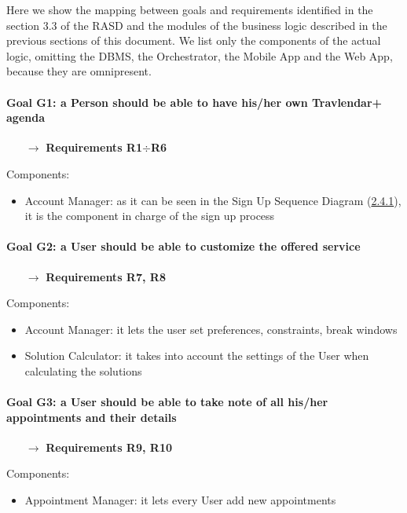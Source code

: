 \newcommand{\requirements}[1]{
	\begin{itemize}
		\item[$\rightarrow$] \textbf{Requirements #1}\mbox{} %
	\end{itemize}
}

Here we show the mapping between goals and requirements identified in the section 3.3 of the RASD and the modules of the business logic described in the previous sections of this document. We list only the components of the actual logic, omitting the DBMS, the Orchestrator, the Mobile App and the Web App, because they are omnipresent.

\paragraph{Goal G1: a Person should be able to have his/her own Travlendar+ agenda}
	\requirements{R1$\div$R6}
	Components:
	\begin{itemize}[label=--]
		\item Account Manager: as it can be seen in the Sign Up Sequence Diagram (\hyperref[sect:sd_signUp]{2.4.1}), it is the component in charge of the sign up process
	\end{itemize}

\paragraph{Goal G2: a User should be able to customize the offered service}
	\requirements{R7, R8}
	Components:
	\begin{itemize}[label=--]
		\item Account Manager: it lets the user set preferences, constraints, break windows
		\item Solution Calculator: it takes into account the settings of the User when calculating the solutions
	\end{itemize}

\paragraph{Goal G3: a User should be able to take note of all his/her appointments and their details}
	\requirements{R9, R10}
	Components:
	\begin{itemize}[label=--]
		\item Appointment Manager: it lets every User add new appointments
	\end{itemize}

